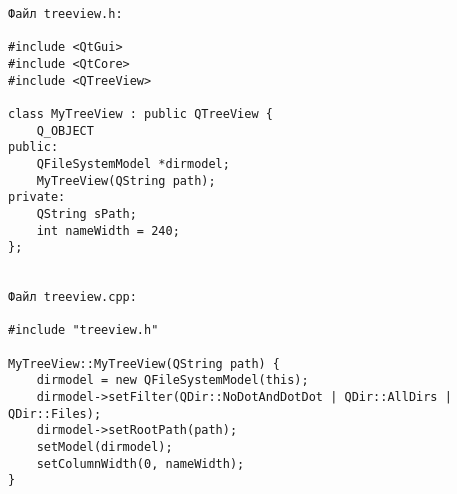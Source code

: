 \begin{verbatim}
Файл treeview.h:

#include <QtGui>
#include <QtCore>
#include <QTreeView>

class MyTreeView : public QTreeView {
    Q_OBJECT
public:
    QFileSystemModel *dirmodel;
    MyTreeView(QString path);
private:
    QString sPath;
    int nameWidth = 240;
};


Файл treeview.cpp:

#include "treeview.h"

MyTreeView::MyTreeView(QString path) {
    dirmodel = new QFileSystemModel(this);
    dirmodel->setFilter(QDir::NoDotAndDotDot | QDir::AllDirs | QDir::Files);
    dirmodel->setRootPath(path);
    setModel(dirmodel);
    setColumnWidth(0, nameWidth);
}
\end{verbatim}
